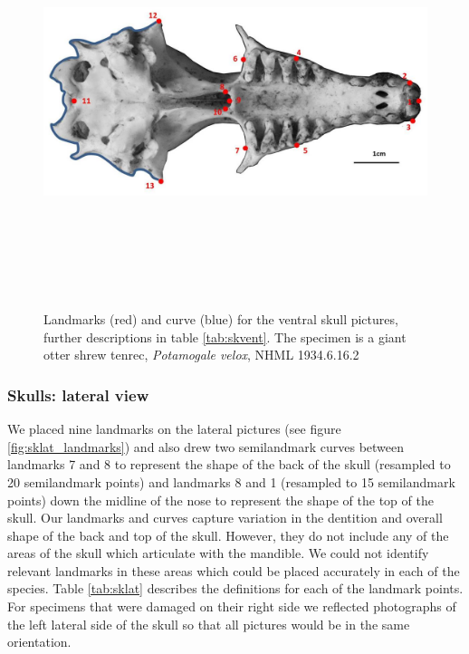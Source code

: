 \documentclass[12pt,a4paper]{article}
\begin{document}
	\begin{figure}[H] 
 	\centering
  	\includegraphics[width=12cm, height=12cm, keepaspectratio=true]
  	{figures/skvent_landmarks_pot_vel.jpg}
    \caption {Landmarks (red) and curve (blue) for the ventral skull pictures, further descriptions in table \ref{tab:skvent}. The specimen is a giant otter shrew tenrec, \textit{Potamogale velox}, NHML 1934.6.16.2}
  	\label{fig:skvent_landmarks}
  	\end{figure}


	\begin{table}[h]
	\caption{Descriptions of the landmarks (points) and curves (semilandmarks) for the skulls in ventral view (see Figure \ref{fig:skvent_landmarks}.} 
	
	\label{tab:skvent}
	\end{table}
	
\subsubsection{Skulls: lateral view}
	We placed nine landmarks on the lateral pictures (see figure \ref{fig:sklat_landmarks}) and also drew two semilandmark curves between landmarks 7 and 8 to represent the shape of the back of the skull (resampled to 20 semilandmark points) and landmarks 8 and 1 (resampled to 15 semilandmark points) down the midline of the nose to represent the shape of the top of the skull. 
	Our landmarks and curves capture variation in the dentition and overall shape of the back and top of the skull. However, they do not include any of the areas of the skull which articulate with the mandible. We could not identify relevant landmarks in these areas which could be placed accurately in each of the species. Table \ref{tab:sklat} describes the definitions for each of the landmark points. 
	For specimens that were damaged on their right side we reflected photographs of the left lateral side of the skull so that all pictures would be in the same orientation.
\end{document}
